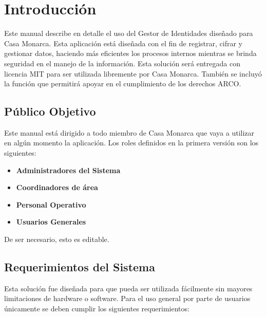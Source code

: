 \documentclass[11pt,twoside]{article}
\renewcommand{\headrulewidth}{0pt}
\begin{document}
\clearpage

\thispagestyle{plain}
\tableofcontents
\newpage

\thispagestyle{plain}
\renewcommand{\headrulewidth}{0pt}
\listoffigures
\listoftables
\newpage

\pagestyle{Criptografia_notes}

\section{Introducción}

Este manual describe en detalle el uso del Gestor de Identidades diseñado
para Casa Monarca. Esta aplicación está diseñada con el fin de registrar,
cifrar y gestionar datos, haciendo más eficientes los procesos internos
mientras se brinda seguridad en el manejo de la información. Esta solución
será entregada con licencia MIT para ser utilizada libremente por Casa
Monarca. También se incluyó la función que permitirá apoyar en el
cumplimiento de los derechos ARCO.\vspace{0.3cm}

\subsection{Público Objetivo}

Este manual está dirigido a todo miembro de Casa Monarca que vaya a utilizar
en algún momento la aplicación. Los roles definidos en la primera versión son
los siguientes:\vspace{0.3cm}

\begin{itemize}
  \item \textbf{Administradores del Sistema}
  \item \textbf{Coordinadores de área}
  \item \textbf{Personal Operativo}
  \item \textbf{Usuarios Generales}
\end{itemize}

De ser necesario, esto es editable.\vspace{0.3cm}

\subsection{Requerimientos del Sistema}

Esta solución fue diseñada para que pueda ser utilizada fácilmente sin
mayores limitaciones de hardware o software. Para el uso general por parte
de usuarios únicamente se deben cumplir los siguientes requerimientos:\vspace{0.3cm}
\end{document}
